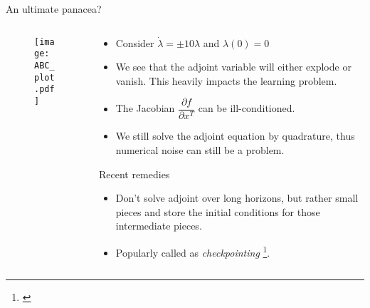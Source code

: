 \documentclass[dvipsnames, 9pt]{beamer}
\begin{document}
\begin{frame}{An ultimate panacea?}
    \begin{columns}
    {\begin{column}{0.45\textwidth}
    \begin{figure}
        \centering
        \texttt{[image: ABC\_plot.pdf]}
    \end{figure}
    \end{column}}
    {\begin{column}{0.5\textwidth}
    \begin{block}{}
        \begin{itemize}
            \item Consider $\dot{\lambda} = \pm 10 \lambda$ and $\lambda(0) = 0$
            \item We see that the adjoint variable will either explode or vanish.
            This heavily impacts the learning problem. 
            \item The Jacobian $\dfrac{\partial f}{\partial x^T}$ can be ill-conditioned.
            \item We still solve the adjoint equation by quadrature, thus numerical noise 
            can still be a problem.
        \end{itemize}
    \end{block}
    \begin{block}{Recent remedies}
        \begin{itemize}
            \item Don't solve adjoint over long horizons, but rather 
            small pieces and store the initial conditions for those intermediate
            pieces.
            \item Popularly called as \textit{checkpointing} \footnote[frame]{\cite{zhuang:dvornek:li:tatikonda:papademetris:duncan:2020}}.
        \end{itemize}
    \end{block}
    \end{column}}
    \end{columns}
\end{frame}
\end{document}

